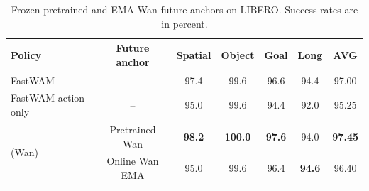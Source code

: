 \begin{table}[htbp]
\vspace{-2mm}
\caption{Frozen pretrained and EMA Wan future anchors on LIBERO. Success rates are in percent.}
\vspace{2mm}
\label{tab:teacherfull}
\centering
\small\setlength{\tabcolsep}{4pt}
\begin{tabular}{lc ccccc}
\toprule
Policy & Future anchor & Spatial & Object & Goal & Long & AVG \\
\midrule
FastWAM & -- & 97.4 & 99.6 & 96.6 & 94.4 & 97.00 \\
FastWAM action-only & -- & 95.0 & 99.6 & 94.4 & 92.0 & 95.25 \\
\midrule
\multirow{2}{*}{\modelname{} (Wan)} & Pretrained Wan & \textbf{98.2} & \textbf{100.0} & \textbf{97.6} & 94.0 & \textbf{97.45} \\
& Online Wan EMA & 95.0 & 99.6 & 96.4 & \textbf{94.6} & 96.40 \\
\bottomrule
\end{tabular}
\vspace{-2mm}
\end{table}
